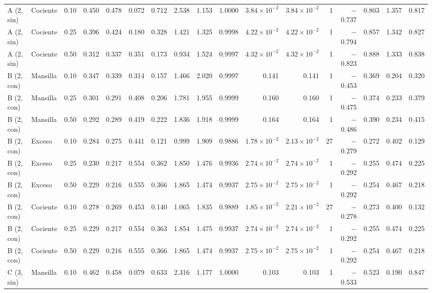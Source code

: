 \documentclass[11pt,letterpaper]{article}
\begin{document}
\begin{landscape}
\begin{scriptsize}
\begin{longtable}{llrrrrrrrrrrrrrrr}
A (2, sin) & Cociente & 0.10 & 0.450 & 0.478 & 0.072 & 0.712 & 2.538 & 1.153 & 1.0000 & $3.84\times10^{-2}$ & $3.84\times10^{-2}$ & 1 & $-$0.737 & 0.803 & 1.357 & 0.817 \\
A (2, sin) & Cociente & 0.25 & 0.396 & 0.424 & 0.180 & 0.328 & 1.421 & 1.325 & 0.9998 & $4.22\times10^{-2}$ & $4.22\times10^{-2}$ & 1 & $-$0.794 & 0.857 & 1.342 & 0.827 \\
A (2, sin) & Cociente & 0.50 & 0.312 & 0.337 & 0.351 & 0.173 & 0.934 & 1.524 & 0.9997 & $4.32\times10^{-2}$ & $4.32\times10^{-2}$ & 1 & $-$0.823 & 0.888 & 1.333 & 0.838 \\
B (2, con) & Mansilla & 0.10 & 0.347 & 0.339 & 0.314 & 0.157 & 1.466 & 2.020 & 0.9997 & 0.141 & 0.141 & 1 & $-$0.453 & 0.369 & 0.204 & 0.320 \\
B (2, con) & Mansilla & 0.25 & 0.301 & 0.291 & 0.408 & 0.206 & 1.781 & 1.955 & 0.9999 & 0.160 & 0.160 & 1 & $-$0.475 & 0.374 & 0.233 & 0.379 \\
B (2, con) & Mansilla & 0.50 & 0.292 & 0.289 & 0.419 & 0.222 & 1.836 & 1.918 & 0.9999 & 0.164 & 0.164 & 1 & $-$0.486 & 0.390 & 0.234 & 0.415 \\
B (2, con) & Exceso & 0.10 & 0.284 & 0.275 & 0.441 & 0.121 & 0.999 & 1.909 & 0.9886 & $1.78\times10^{-2}$ & $2.13\times10^{-2}$ & 27 & $-$0.279 & 0.272 & 0.402 & 0.129 \\
B (2, con) & Exceso & 0.25 & 0.230 & 0.217 & 0.554 & 0.362 & 1.850 & 1.476 & 0.9936 & $2.74\times10^{-2}$ & $2.74\times10^{-2}$ & 1 & $-$0.292 & 0.255 & 0.474 & 0.225 \\
B (2, con) & Exceso & 0.50 & 0.229 & 0.216 & 0.555 & 0.366 & 1.865 & 1.474 & 0.9937 & $2.75\times10^{-2}$ & $2.75\times10^{-2}$ & 1 & $-$0.292 & 0.254 & 0.467 & 0.218 \\
B (2, con) & Cociente & 0.10 & 0.278 & 0.269 & 0.453 & 0.140 & 1.065 & 1.835 & 0.9889 & $1.85\times10^{-2}$ & $2.21\times10^{-2}$ & 27 & $-$0.278 & 0.273 & 0.400 & 0.132 \\
B (2, con) & Cociente & 0.25 & 0.229 & 0.217 & 0.554 & 0.363 & 1.854 & 1.475 & 0.9937 & $2.74\times10^{-2}$ & $2.74\times10^{-2}$ & 1 & $-$0.292 & 0.255 & 0.474 & 0.225 \\
B (2, con) & Cociente & 0.50 & 0.229 & 0.216 & 0.555 & 0.366 & 1.865 & 1.474 & 0.9937 & $2.75\times10^{-2}$ & $2.75\times10^{-2}$ & 1 & $-$0.292 & 0.254 & 0.467 & 0.218 \\
C (3, sin) & Mansilla & 0.10 & 0.462 & 0.458 & 0.079 & 0.633 & 2.316 & 1.177 & 1.0000 & 0.103 & 0.103 & 1 & $-$0.533 & 0.523 & 0.190 & 0.847 \\

\end{longtable}
\end{scriptsize}
\end{landscape}
\end{document}
